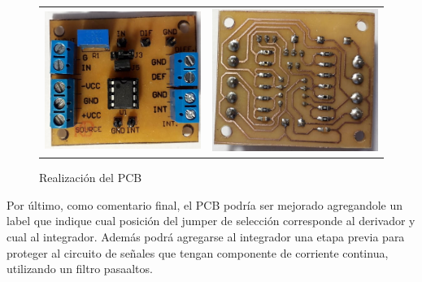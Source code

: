 \begin{figure}[H]
	\centering
	\begin{tabular}{c c}
		\includegraphics[scale=0.55]{../EJ4/Recursos/Altium/OVERLAY_Hecho.png} &
		\includegraphics[scale=0.55]{../EJ4/Recursos/Altium/PCB_Hecho.png}
	\end{tabular}
	\caption{Realizaci\'on del PCB}
	\label{fig:hecho}
\end{figure}

Por \'ultimo, como comentario final, el PCB podr\'ia ser mejorado agregandole un label que indique cual posici\'on del jumper de selecci\'on
corresponde al derivador y cual al integrador. Adem\'as podr\'a agregarse al integrador una etapa previa para proteger al circuito de se\~nales que tengan
componente de corriente continua, utilizando un filtro pasaaltos.

